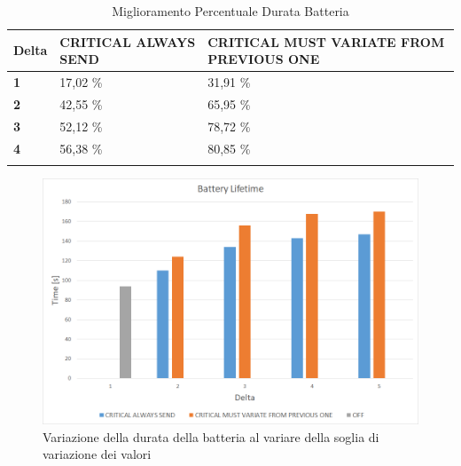     \begin{table}%
      \renewcommand{\arraystretch}{1.2}
       \caption{Miglioramento Percentuale Durata Batteria}
       \label{tab:MiglioramentoPercentuale}
       \centering
         \begin{tabular}{  P{1cm}  P{5cm} P{7cm} }
            \firsthline
            \textbf{Delta} & \textbf{CRITICAL ALWAYS SEND } & \textbf{CRITICAL MUST VARIATE FROM PREVIOUS ONE} \\
          \hline
            \textbf{1} & 17,02 \% & 31,91 \% \\
            \textbf{2} & 42,55 \% & 65,95 \% \\
            \textbf{3} & 52,12 \% & 78,72 \% \\
            \textbf{4} & 56,38 \% & 80,85 \% \\
          \lasthline
         \end{tabular}
    \end{table}
    
    \begin{figure}
      \centering
      \includegraphics[width=\linewidth]{../Immagini/GraficoBatteryLifetimeTime.png}
      \caption{Variazione della durata della batteria al variare della soglia di variazione dei valori}
      \label{fig:BatteryLifetimeTime}
    \end{figure}

